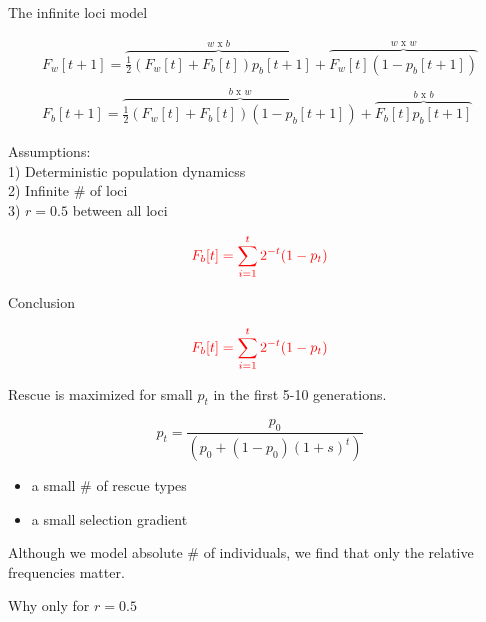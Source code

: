 \documentclass{beamer}
\begin{document}
\begin{frame}{The infinite loci model}

\begin{equation}
    \begin{array}{l}
	F_w[t+1] = \overbrace{\frac{1}{2} (F_w[t]+F_b[t]) p_b[t+1]}^\text{$w$ x $b$}  + \overbrace{F_w[t] (1-p_b[t+1])}^\text{$w$ x $w$}
	 \\ \\
	F_b[t+1]  = \overbrace{\frac{1}{2} (F_w[t]+F_b[t]) (1-p_b[t+1])}^\text{$b$ x $w$} 
	+ \overbrace{F_b[t] p_b[t+1]}^\text{$b$ x $b$}
	\end{array}
\end{equation}

Assumptions: \\
1) Deterministic population dynamicss \\
2) Infinite \# of loci \\
3) $r = 0.5$ between all loci 
    
\begin{equation*}
    \color{red} F_b[t] = \sum_{i=1}^t 2^{-t} (1-p_t)
\end{equation*}
\end{frame}

\begin{frame}{Conclusion}

\begin{equation*}
    \color{red} F_b[t] = \sum_{i=1}^t 2^{-t} (1-p_t)
\end{equation*}

Rescue is maximized for small $p_t$ in the first 5-10 generations.

\begin{equation*}
    p_t = \frac{p_0}{(p_0+(1-p_0) (1+s)^t)}
\end{equation*}

\begin{itemize}
  \item {a small \# of rescue types }
  \item {a small selection gradient}
\end{itemize}

Although we model absolute \# of individuals, we find that only the relative frequencies matter.

\end{frame}

\begin{frame}{Why only for $r=0.5$}
    
\end{frame}
\end{document}
